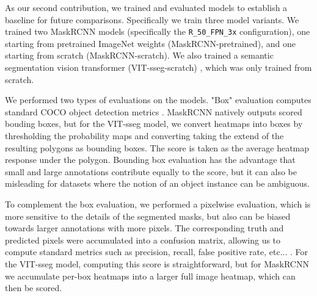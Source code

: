 \documentclass[10pt,twocolumn,letterpaper]{article}
\begin{document}
As our second contribution, we trained and evaluated models to establish a baseline for future comparisons.
Specifically we train three model variants.
We trained two MaskRCNN \cite{he2017mask} models (specifically the \texttt{R\_50\_FPN\_3x} configuration),
  one starting from pretrained ImageNet weights (MaskRCNN-pretrained), and one starting from scratch
  (MaskRCNN-scratch).
We also trained a semantic segmentation vision transformer (VIT-sseg-scratch)
  \cite{Greenwell_2024_WACV,crall_geowatch_2024}, which was only trained from scratch.



We performed two types of evaluations on the models.
"Box" evaluation computes standard COCO object detection metrics \cite{lin_microsoft_2014}.
MaskRCNN natively outputs scored bouding boxes, but for the VIT-sseg model, we convert heatmaps into boxes
  by thresholding the probability maps and converting taking the extend of the resulting polygons as bounding
  boxes.
The score is taken as the average heatmap response under the polygon.
Bounding box evaluation has the advantage that small and large annotations contribute equally to the score,
  but it can also be misleading for datasets where the notion of an object instance can be ambiguous.

To complement the box evaluation, we performed a pixelwise evaluation, which is more sensitive to the
  details of the segmented masks, but also can be biased towards larger annotations with more pixels.
The corresponding truth and predicted pixels were accumulated into a confusion matrix, allowing us to
  compute standard metrics such as precision, recall, false positive rate, etc... \cite{powers_evaluation_2011}.
For the VIT-sseg model, computing this score is straightforward, but for MaskRCNN we accumulate per-box
  heatmaps into a larger full image heatmap, which can then be scored.
\end{document}

